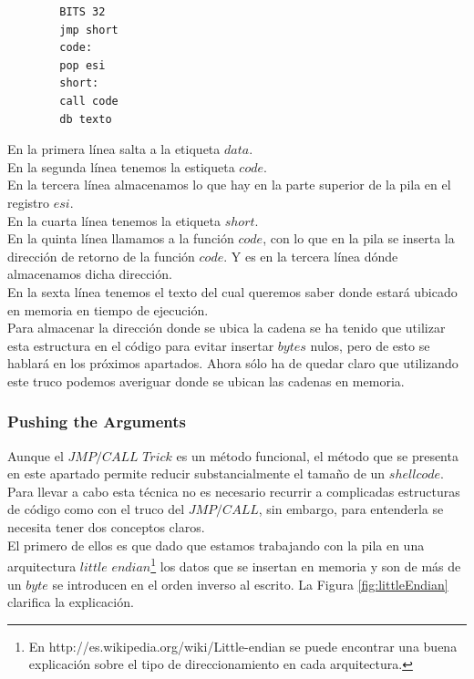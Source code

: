 \documentclass [titlepage, 12pt]{article}
\begin{document}
\lstset{language=[x86masm]Assembler,caption=Implementaci\'on del jmp/call trick,label=fig:jmpcall}
\begin{lstlisting}
		BITS 32
		jmp short
		code:
		pop esi
		short:
		call code
		db texto
\end{lstlisting}
En la primera l\'inea salta a la etiqueta $data$.\\
En la segunda l\'inea tenemos la estiqueta $code$.\\
En la tercera l\'inea almacenamos lo que hay en la parte superior de la pila en el registro $esi$.\\
En la cuarta l\'inea tenemos la etiqueta $short$.\\
En la quinta l\'inea llamamos a la funci\'on $code$, con lo que en la pila se inserta la direcci\'on de retorno de la funci\'on $code$. Y es en la tercera l\'inea d\'onde almacenamos dicha direcci\'on.\\
En la sexta l\'inea tenemos el texto del cual queremos saber donde estar\'a ubicado en memoria en tiempo de ejecuci\'on.\\
Para almacenar la direcci\'on donde se ubica la cadena se ha tenido que utilizar esta estructura en el c\'odigo para evitar insertar $bytes$ nulos, pero de esto se hablar\'a en los pr\'oximos apartados. Ahora s\'olo ha de quedar claro que utilizando este truco podemos averiguar donde se ubican las cadenas en memoria.\pagebreak

\subsubsection{Pushing the Arguments}
Aunque el $JMP/CALL$ $Trick$ es un m\'etodo funcional, el m\'etodo que se presenta en este apartado permite reducir substancialmente el tama\~no de un $shellcode$. Para llevar a cabo esta t\'ecnica no es necesario recurrir a complicadas estructuras de c\'odigo como con el truco del $JMP/CALL$, sin embargo, para entenderla se necesita tener dos conceptos claros.\\
El primero de ellos es que dado que estamos trabajando con la pila en una arquitectura $little$ $endian$\footnote{En http://es.wikipedia.org/wiki/Little-endian se puede encontrar una buena explicaci\'on sobre el tipo de direccionamiento en cada arquitectura.} los datos que se insertan en memoria y son de m\'as de un $byte$ se introducen en el orden inverso al escrito. La Figura \ref{fig:littleEndian} clarifica la explicaci\'on.
\end{document}

